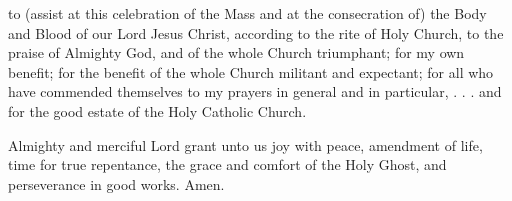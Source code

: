  to (assist at this celebration of the Mass and at the consecration of) the Body and Blood of our Lord Jesus Christ, according to the rite of Holy Church, to the praise of Almighty God, and of the whole Church triumphant; for my own benefit; for the benefit of the whole Church militant and expectant; for all who have commended themselves to my prayers in general and in particular,  . . . and for the good estate of the Holy Catholic Church.
\par
{}
 Almighty and merciful Lord grant unto us joy with peace, amendment of life, time for true repentance, the grace and comfort of the Holy Ghost, and perseverance in good works. Amen.